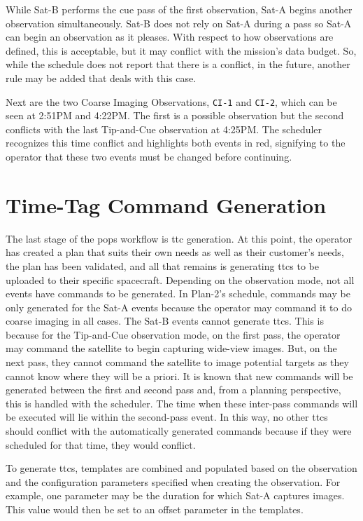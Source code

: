 While Sat-B performs the cue pass of the first observation, Sat-A begins
another observation simultaneously. Sat-B does not rely on Sat-A during a pass
so Sat-A can begin an observation as it pleases. With respect to how
observations are defined, this is acceptable, but it may conflict with the
mission's data budget. So, while the schedule does not report that there is a
conflict, in the future, another rule may be added that deals with this case.

Next are the two Coarse Imaging Observations, \texttt{CI-1} and \texttt{CI-2},
which can be seen at 2:51PM and 4:22PM\@. The first is a possible observation
but the second conflicts with the last Tip-and-Cue observation at 4:25PM\@.
The scheduler recognizes this time conflict and highlights both events in red,
signifying to the operator that these two events must be changed before
continuing.

\section{Time-Tag Command Generation}\label{sec:ttc-gen}

The last stage of the \gls{pops} workflow is \gls{ttc} generation.  At this
point, the operator has created a plan that suits their own needs as well as
their customer’s needs, the plan has been validated, and all that remains is
generating \glspl{ttc} to be uploaded to their specific spacecraft.  Depending
on the observation mode, not all events have commands to be generated. In
Plan-2's schedule, commands may be only generated for the Sat-A events because
the operator may command it to do coarse imaging in all cases. The Sat-B events cannot
generate \glspl{ttc}. This is because for the Tip-and-Cue observation mode, on
the first pass, the operator may command the satellite to begin capturing
wide-view images.  But, on the next pass, they cannot command the satellite to
image potential targets as they cannot know where they will be a priori. It is
known that new commands will be generated between the first and second pass
and, from a planning perspective, this is handled with the scheduler. The time
when these inter-pass commands will be executed will lie within the second-pass
event. In this way, no other \glspl{ttc} should conflict with the automatically
generated commands because if they were scheduled for that time, they would
conflict. 

To generate \glspl{ttc}, templates are combined and populated based on the
observation and the configuration parameters specified when creating the
observation. For example, one parameter may be the duration for which Sat-A
captures images. This value would then be set to an offset parameter in the
templates. 

